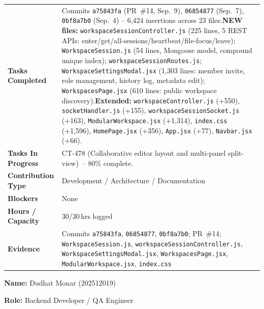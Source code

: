 \documentclass[11pt,a4paper]{article}
\newcommand{\field}[2]{\textbf{#1:} #2\par}
\begin{document}
{\small
\begin{tabular}{>{\bfseries}p{} p{}}
\toprule
Tasks Completed & Commits \texttt{a75843fa} (PR~\#14, Sep.\ 9), \texttt{06854877} (Sep.\ 7), \texttt{0bf8a7b0} (Sep.\ 4) -- 6,424 insertions across 23 files:\newline \textbf{NEW files:} \texttt{workspaceSessionController.js} (225 lines, 5 REST APIs: enter/get/all-sessions/heartbeat/file-focus/leave); \texttt{WorkspaceSession.js} (54 lines, Mongoose model, compound unique index); \texttt{workspaceSessionRoutes.js}; \texttt{WorkspaceSettingsModal.jsx} (1,303 lines: member invite, role management, history log, metadata edit); \texttt{WorkspacesPage.jsx} (610 lines: public workspace discovery).\newline \textbf{Extended:} \texttt{workspaceController.js} (+550), \texttt{socketHandler.js} (+155), \texttt{workspaceSessionSocket.js} (+163), \texttt{ModularWorkspace.jsx} (+1,314), \texttt{index.css} (+1,596), \texttt{HomePage.jsx} (+356), \texttt{App.jsx} (+77), \texttt{Navbar.jsx} (+66). \\
Tasks In Progress & CT-478 (Collaborative editor layout and multi-panel split-view)~-- 80\% complete. \\
Contribution Type & Development / Architecture / Documentation \\
Blockers & None \\
Hours / Capacity & 30/30\,hrs logged \\
Evidence & Commits \texttt{a75843fa}, \texttt{06854877}, \texttt{0bf8a7b0}; PR~\#14; \texttt{WorkspaceSession.js}, \texttt{workspaceSessionController.js}, \texttt{WorkspaceSettingsModal.jsx}, \texttt{WorkspacesPage.jsx}, \texttt{ModularWorkspace.jsx}, \texttt{index.css} \\
\bottomrule
\end{tabular}
}

\vspace{6pt}

\field{Name}{Dudhat Monar (202512019)}
\field{Role}{Backend Developer / QA Engineer}

\vspace{4pt}
\end{document}
